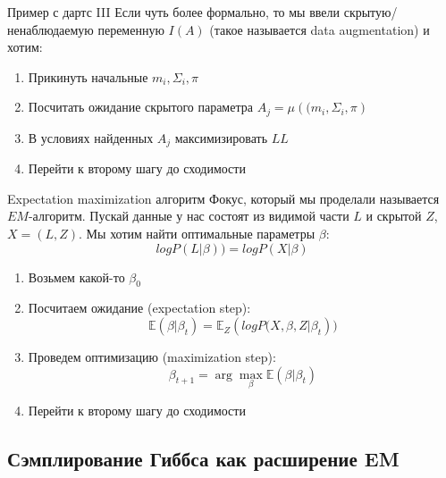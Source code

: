 \documentclass[14pt, fleqn, xcolor={dvipsnames, table}]{beamer}
\begin{document}
\begin{frame}{Пример с дартс III}
\small
Если чуть более формально, то мы ввели скрытую/ненаблюдаемую переменную $I(A)$ (такое называется data augmentation) и хотим:
\begin{enumerate}
  \item Прикинуть начальные $m_i, \Sigma_i, \pi$
  \item Посчитать ожидание скрытого параметра $A_j = \mu({(m_i, \Sigma_i}, \pi)$
  \item В условиях найденных $A_j$ максимизировать $LL$
  \item Перейти к второму шагу до сходимости
\end{enumerate}
\end{frame}

\begin{frame}{Expectation maximization алгоритм}
\small
Фокус, который мы проделали называется $EM$-алгоритм. Пускай данные у нас состоят из видимой части $L$ и скрытой $Z$, $X = (L,Z)$. Мы хотим найти оптимальные параметры $\beta$:
$$
log P(L|\beta)) = log P(X|\beta)
$$
\begin{enumerate}
  \item Возьмем какой-то $\beta_0$
  \item Посчитаем ожидание (expectation step):
  $$
  \mathbb{E}(\beta | \beta_t) = \mathbb{E}_Z \left(log P(X, \beta, Z | \beta_t \right))
  $$
  \item Проведем оптимизацию (maximization step):
  $$
  \beta_{t+1} = \arg \max_{\beta} \mathbb{E}(\beta | \beta_t)
  $$
  \item Перейти к второму шагу до сходимости
\end{enumerate}
\end{frame}

\subsection{Сэмплирование Гиббса как расширение EM}
\end{document}

